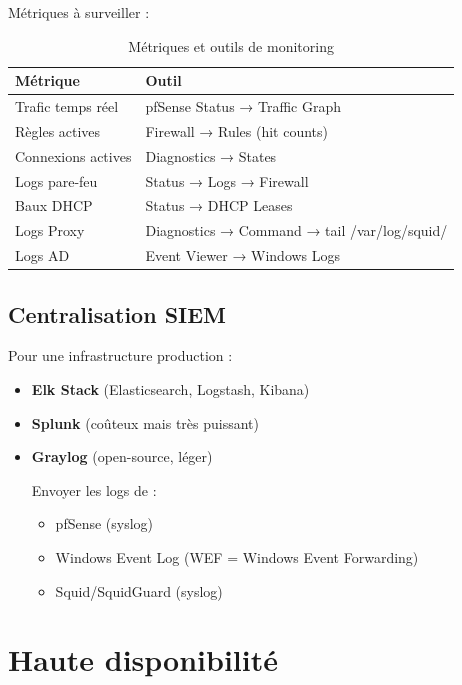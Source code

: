 Métriques à surveiller :

\begin{table}[H]
    \centering
    \begin{tabularx}{\textwidth}{|l|p{4cm}|}
        \hline
        \textbf{Métrique} & \textbf{Outil} \\
        \hline
        Trafic temps réel & pfSense Status → Traffic Graph \\
        \hline
        Règles actives & Firewall → Rules (hit counts) \\
        \hline
        Connexions actives & Diagnostics → States \\
        \hline
        Logs pare-feu & Status → Logs → Firewall \\
        \hline
        Baux DHCP & Status → DHCP Leases \\
        \hline
        Logs Proxy & Diagnostics → Command → tail /var/log/squid/ \\
        \hline
        Logs AD & Event Viewer → Windows Logs \\
        \hline
    \end{tabularx}
    \caption{Métriques et outils de monitoring}
    \label{tab:monitoring}
\end{table}

\subsection{Centralisation SIEM}

Pour une infrastructure production :

\begin{itemize}
    \item \textbf{Elk Stack} (Elasticsearch, Logstash, Kibana)
    \item \textbf{Splunk} (coûteux mais très puissant)
    \item \textbf{Graylog} (open-source, léger)
    
    Envoyer les logs de :
    \begin{itemize}
        \item pfSense (syslog)
        \item Windows Event Log (WEF = Windows Event Forwarding)
        \item Squid/SquidGuard (syslog)
    \end{itemize}
\end{itemize}

\section{Haute disponibilité}

